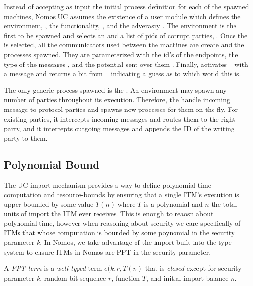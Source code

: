 Instead of accepting as input the initial process definition for each of the spawned machines, Nomos UC assumes the existence of a user module  which defines the environment, , the functionality, , and the adverasry .
The environment is the first to be spawned and selects an  and a list of pids of corrupt parties, .
Once the  is selected, all the communicators used between the machines are create and the processes spawned.
They are parameterized with the id's of the endpoints, the type of the messages , and the potential sent over them .
Finally,  activates \Environment~ with a  message and returns a bit from \Environment~ indicating a guess as to which world this is.

The only generic process spawned is the .
An environment may spawn any number of parties throughout its execution.
Therefore, the  handle incoming message to protocol parties and spawns new processes for them on the fly.
For existing parties, it intercepts incoming messages and routes them to the right party, and it intercepts outgoing messages and appends the ID of the writing party to them. 


\subsection{Polynomial Bound}
The UC import mechanism provides a way to define polynomial time computation and resource-bounds by ensuring that a single ITM's execution is upper-bounded by some value $T(n)$ where $T$ is a polynomial and $n$ the total units of import the ITM ever receives.
This is enough to reaosn about polynomial-time, however when reasoning about security we care specifically of ITMs that whose computation is bounded by some poynomial in the security parameter $k$. 
In Nomos, we take advantage of the import built into the type system to ensure ITMs in Nomos are PPT in the security parameter. 

\begin{definition}\label{def:pptterm}
A \textit{PPT term} is a \textit{well-typed} term $e(k, r, T(n)$ that is \textit{closed} except for security parameter $k$, random bit sequence $r$, function $T$, and initial import balance $n$.
\end{definition}

